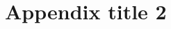\documentclass[final,5p,times,twocolumn,number,sort&compress]{elsarticle}
\begin{document}
\section{Appendix title 2}









\end{document}
